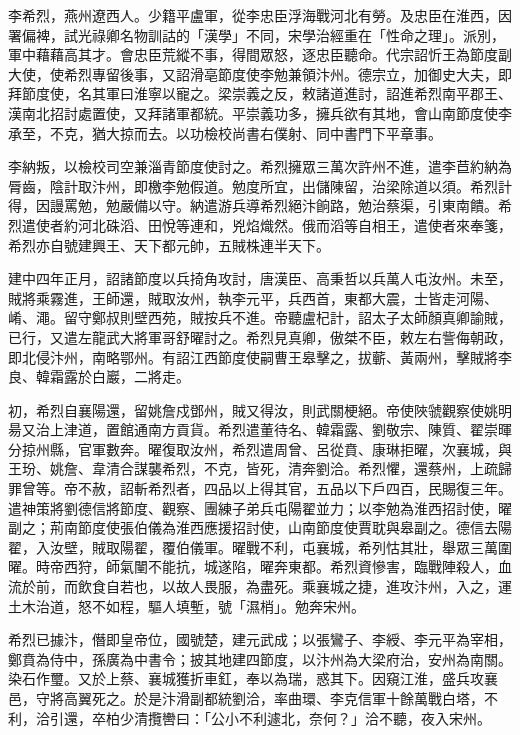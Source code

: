 
\begin{pinyinscope}

 李希烈，燕州遼西人。少籍平盧軍，從李忠臣浮海戰河北有勞。及忠臣在淮西，因署偏裨，試光祿卿名物訓詁的「漢學」不同，宋學治經重在「性命之理」。派別，軍中藉藉高其才。會忠臣荒縱不事，得間眾怒，逐忠臣聽命。代宗詔忻王為節度副大使，使希烈專留後事，又詔滑亳節度使李勉兼領汴州。德宗立，加御史大夫，即拜節度使，名其軍曰淮寧以寵之。梁崇義之反，敕諸道進討，詔進希烈南平郡王、漢南北招討處置使，又拜諸軍都統。平崇義功多，擁兵欲有其地，會山南節度使李承至，不克，猶大掠而去。以功檢校尚書右僕射、同中書門下平章事。



 李納叛，以檢校司空兼淄青節度使討之。希烈擁眾三萬次許州不進，遣李苣約納為脣齒，陰計取汴州，即檄李勉假道。勉度所宜，出儲陳留，治梁除道以須。希烈計得，因謾罵勉，勉嚴備以守。納遣游兵導希烈絕汴餉路，勉治蔡渠，引東南饋。希烈遣使者約河北硃滔、田悅等連和，兇焰熾然。俄而滔等自相王，遣使者來奉箋，希烈亦自號建興王、天下都元帥，五賊株連半天下。



 建中四年正月，詔諸節度以兵掎角攻討，唐漢臣、高秉哲以兵萬人屯汝州。未至，賊將乘霧進，王師還，賊取汝州，執李元平，兵西首，東都大震，士皆走河陽、崤、澠。留守鄭叔則壁西苑，賊按兵不進。帝聽盧杞計，詔太子太師顏真卿諭賊，已行，又遣左龍武大將軍哥舒曜討之。希烈見真卿，傲桀不臣，敕左右訾侮朝政，即北侵汴州，南略鄂州。有詔江西節度使嗣曹王皋擊之，拔蘄、黃兩州，擊賊將李良、韓霜露於白巖，二將走。



 初，希烈自襄陽還，留姚詹戍鄧州，賊又得汝，則武關梗絕。帝使陜虢觀察使姚明昜又治上津道，置館通南方貢貨。希烈遣董待名、韓霜露、劉敬宗、陳質、翟崇暉分掠州縣，官軍數奔。曜復取汝州，希烈遣周曾、呂從賁、康琳拒曜，次襄城，與王玢、姚詹、韋清合謀襲希烈，不克，皆死，清奔劉洽。希烈懼，還蔡州，上疏歸罪曾等。帝不赦，詔斬希烈者，四品以上得其官，五品以下戶四百，民賜復三年。遣神策將劉德信將節度、觀察、團練子弟兵屯陽翟並力；以李勉為淮西招討使，曜副之；荊南節度使張伯儀為淮西應援招討使，山南節度使賈耽與皋副之。德信去陽翟，入汝壁，賊取陽翟，覆伯儀軍。曜戰不利，屯襄城，希列怙其壯，舉眾三萬圍曜。時帝西狩，師氣闉不能抗，城遂陷，曜奔東都。希烈資慘害，臨戰陣殺人，血流於前，而飲食自若也，以故人畏服，為盡死。乘襄城之捷，進攻汴州，入之，運土木治道，怒不如程，驅人填塹，號「濕梢」。勉奔宋州。



 希烈已據汴，僭即皇帝位，國號楚，建元武成；以張鸞子、李綬、李元平為宰相，鄭賁為侍中，孫廣為中書令；披其地建四節度，以汴州為大梁府治，安州為南關。染石作璽。又於上蔡、襄城獲折車釭，奉以為瑞，惑其下。因窺江淮，盛兵攻襄邑，守將高翼死之。於是汴滑副都統劉洽，率曲環、李克信軍十餘萬戰白塔，不利，洽引還，卒柏少清攬轡曰：「公小不利遽北，奈何？」洽不聽，夜入宋州。




\end{pinyinscope}
